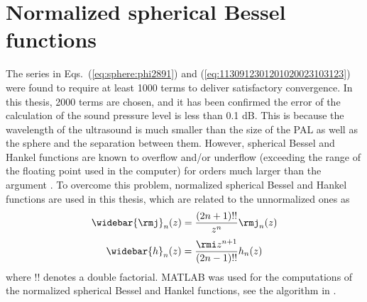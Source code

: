 \section{Normalized spherical Bessel functions}
The series in Eqs.~(\ref{eq:sphere:phi2891}) and (\ref{eq:1130912301201020023103123}) were found to require at least 1000 terms to deliver satisfactory convergence.
In this thesis, 2000 terms are chosen, and it has been confirmed the error of the calculation of the sound pressure level is less than 0.1 dB. 
This is because the wavelength of the ultrasound is much smaller than the size of the PAL as well as the sphere and the separation between them. 
However, spherical Bessel and Hankel functions are known to overflow and/or underflow (exceeding the range of the floating point used in the computer) for orders much larger than the argument \cite{Majic2020NumericallyStableFormulation}. 
To overcome this problem, normalized spherical Bessel and Hankel functions are used in this thesis, which are related to the unnormalized ones as \cite{Majic2020NumericallyStableFormulation}
\begin{equation}
    \widebar{\rmj}_n(z) =\frac{(2n+1)!!}{z^n} \rmj_n(z)
\end{equation}
\begin{equation}
    \widebar{h}_n(z) =
    \frac{\rmi z^{n+1}}{(2n-1)!!} h_n(z)
\end{equation}
where $!!$ denotes a double factorial. MATLAB was used for the computations of the normalized spherical Bessel and Hankel functions, see the algorithm in \cite{Majic2020NumericallyStableFormulation}.

